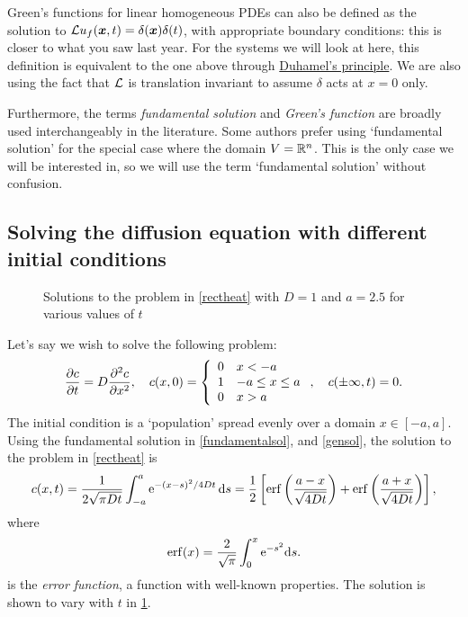 \documentclass[main.tex]{subfiles}
\begin{document}
\begin{nem}
Green's functions for linear homogeneous PDEs can also be defined as the solution to $\Lin u_f(\v{x},t) = \delta(\v{x})\delta(t)$, with appropriate boundary conditions: this is closer to what you saw last year. For the systems we will look at here, this definition is equivalent to the one above through \href{https://en.wikipedia.org/wiki/Duhamel\%27s_principle}{Duhamel's principle}. We are also using the fact that $\mathcal{L}$ is translation invariant to assume $\delta$ acts at $x=0$ only.

Furthermore, the terms \emph{fundamental solution} and \emph{Green's function} are broadly used interchangeably in the literature. Some authors prefer using `fundamental solution' for the special case where the domain $V = \mathbb{R}^n$. This is the only case we will be interested in, so we will use the term `fundamental solution' without confusion. 
\end{nem}

\subsection{Solving the diffusion equation with different initial conditions}
\begin{figure}
\begin{center}

\end{center}
\caption{Solutions to the problem in \cref{rectheat} with $D=1$ and $a=2.5$ for various values of $t$}
\label{heatrect}
\end{figure}
Let's say we wish to solve the following problem:
\begin{equation}
\label{rectheat}
\pd{c}{t} = D \pdd{c}{x},\quad c(x,0) =  \left\{\begin{array}{ll}
0 & x< -a\\
1 & -a \leq x \leq a\\
0 & x>a
\end{array}
\right. , \quad c(\pm \infty ,t) = 0. 
\end{equation}
The initial condition is a `population' spread evenly over a domain $x\in[-a,a]$. Using the fundamental solution in \cref{fundamentalsol}, and \cref{gensol}, the solution to the problem in \cref{rectheat} is 
\begin{equation}
c(x,t) = \frac{1}{ 2\sqrt{\pi Dt}}\int_{-a}^{a} \mathrm{e}^{-(x-s)^2/4Dt}\,\mathrm{d}{s} = \frac{1}{2}\left[\operatorname{erf}\left(\frac{a-x}{\sqrt{4Dt}}\right) + \operatorname{erf}\left(\frac{a+x}{\sqrt{4Dt}}\right)\right],
\end{equation} 
where 
\begin{equation}
\operatorname{erf}(x) = \frac{2}{\sqrt{\pi}}\int_{0}^{x}\mathrm{e}^{-s^2}\mathrm{d}{s}.
\end{equation}
is the \emph{error function}, a function with well-known properties. The solution is shown to vary with $t$ in \cref{heatrect}.
\end{document}
